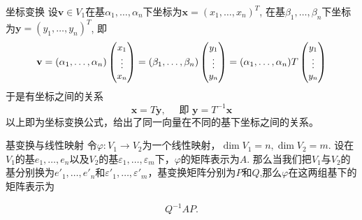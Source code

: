 \begin{frame}

\begin{block}{坐标变换}
设$\mathbf{v}\in V_1$在基$\alpha_1,\ldots,\alpha_n$下坐标为$\mathbf{x} = (x_1,\ldots,x_n)^T$, 在基$\beta_1,\ldots,\beta_n$下坐标为$\mathbf{y} = (y_1,\ldots,y_n)^T$, 即
\begin{displaymath}
\small
\mathbf{v} = (\alpha_1,\ldots,\alpha_n) \begin{pmatrix} x_1 \\ \vdots \\ x_n \end{pmatrix} = (\beta_1,\ldots,\beta_n) \begin{pmatrix} y_1 \\ \vdots \\ y_n \end{pmatrix} = (\alpha_1,\ldots,\alpha_n) T \begin{pmatrix} y_1 \\ \vdots \\ y_n \end{pmatrix}
\end{displaymath}
于是有坐标之间的关系
\[
\mathbf{x} = T\mathbf{y}, \quad \text{ 即 } \mathbf{y} = T^{-1}\mathbf{x}
\]
以上即为坐标变换公式，给出了同一向量在不同的基下坐标之间的关系。
\end{block}

\end{frame}


\begin{frame}

\begin{block}{基变换与线性映射}
令$\varphi: V_1 \to V_2$为一个线性映射，$\dim V_1 = n, \dim V_2 = m$. 设在$V_1$的基$e_1,\ldots,e_n$以及$V_2$的基$\varepsilon_1,\ldots,\varepsilon_m$下，$\varphi$的矩阵表示为$A$. 那么当我们把$V_1$与$V_2$的基分别换为$e'_1,\ldots,e'_n$和$\varepsilon'_1,\ldots,\varepsilon'_m$，基变换矩阵分别为$P$和$Q$,那么$\varphi$在这两组基下的矩阵表示为

\pause

$$Q^{-1}AP.$$
\end{block}

\end{frame}


